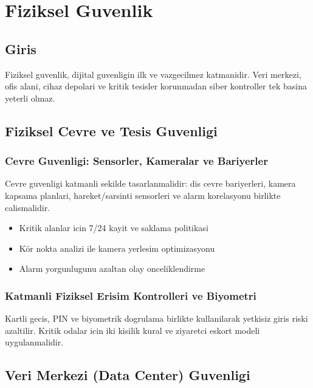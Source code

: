 ﻿\chapter{Fiziksel Guvenlik}

\section*{Giris}
Fiziksel guvenlik, dijital guvenligin ilk ve vazgecilmez katmanidir. Veri merkezi, ofis alani, cihaz depolari ve kritik tesisler korunmadan siber kontroller tek basina yeterli olmaz.

\section{Fiziksel Cevre ve Tesis Guvenligi}
\subsection{Cevre Guvenligi: Sensorler, Kameralar ve Bariyerler}
Cevre guvenligi katmanli sekilde tasarlanmalidir: dis cevre bariyerleri, kamera kapsama planlari, hareket/sarsinti sensorleri ve alarm korelasyonu birlikte calismalidir.
\begin{itemize}
    \item Kritik alanlar icin 7/24 kayit ve saklama politikasi
    \item Kör nokta analizi ile kamera yerlesim optimizasyonu
    \item Alarm yorgunlugunu azaltan olay onceliklendirme
\end{itemize}

\subsection{Katmanli Fiziksel Erisim Kontrolleri ve Biyometri}
Kartli gecis, PIN ve biyometrik dogrulama birlikte kullanilarak yetkisiz giris riski azaltilir. Kritik odalar icin iki kisilik kural ve ziyaretci eskort modeli uygulanmalidir.

\section{Veri Merkezi (Data Center) Guvenligi}
